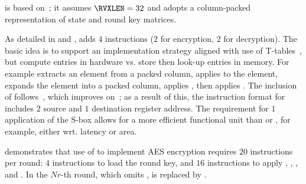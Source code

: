 
is based on~\cite{NadIkeKur:04,BBFR:06,Saarinen:20}; it
assumes 
$\RVXLEN = 32$
and adopts a 
column-packed 
representation of state and round key matrices.

As detailed in
and
,
adds
$ 4$
instructions ($2$ for encryption, $2$ for decryption).
The basic idea is to support an implementation strategy aligned with use
of 
T-tables~\cite[Section 4.2]{DaeRij:02}, 
but compute entries in hardware vs. store then look-up entries in memory.
For example
extracts                     an     element from a packed column,
 applies   to the element,
 expands                        the element into a packed column,
 applies ,
then
 applies .
The inclusion of  follows~\cite{Saarinen:20}, which
improves on~\cite{NadIkeKur:04,BBFR:06}; as a result of this,
the instruction format for
includes $2$ source and $1$ destination register address.
The requirement for $1$ application of the S-box allows for a more efficient 
functional unit than  or , for example, either wrt. latency or 
area.

demonstrates that use of  to implement AES encryption requires
$20$ instructions per round:
$ 4$            
     instructions to load the round key,
and
$16$  
     instructions to apply , , , and .
In the $Nr$-th round, which omits ,
is replaced by 
     .

